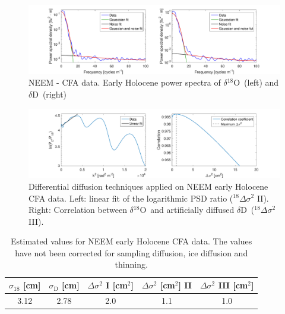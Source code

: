 \documentclass[11pt, draftcls, onecolumn]{IEEEtran} %
\numberwithin{equation}{section}
\numberwithin{table}{section}
\numberwithin{figure}{section}
\newcommand{\delOx}{$\delta{}^{18}\mathrm{O}$}
\newcommand{\delD}{$\delta\mathrm{D}$}
\begin{document}
\begin{appendices}
\begin{figure}[H]
	\vspace*{2mm}
	\begin{center}
		\includegraphics[width=1\textwidth]{Figure_25}
		\caption{NEEM - CFA data. Early Holocene power spectra of \delOx~(left) and \delD~(right)}  \label{fig:NEEM_cfa_fig_1}
	\end{center}
\end{figure}

\begin{figure}[H]
	\vspace*{2mm}
	\begin{center}
		\includegraphics[width=1\textwidth]{Figure_26}
		\caption{Differential diffusion techniques applied on NEEM early Holocene CFA data. 
			Left: linear fit of the logarithmic PSD ratio ($^{18}\Delta\sigma^2$ II). Right: 
			Correlation between \delOx~and artificially diffused \delD~($^{18}\Delta\sigma^2$ III).}  \label{fig:NEEM_cfa_fig_2}
	\end{center}
\end{figure}

\begin{table}[H]
	\center
	\caption{Estimated values for NEEM early Holocene CFA data.
	The values have not been corrected for sampling diffusion, ice diffusion and thinning.}
	\label{NEEM_cfa_tbl}
	\begin{tabular}{c c c c c} 
		\toprule
		$\sigma_{18}$ [cm] & $\sigma_\mathrm{D}$ [cm] & $\Delta\sigma^2$ I [cm$^2$] & $\Delta\sigma^2$ [cm$^2$] II & $\Delta\sigma^2$ III [cm$^2$] \\
		\midrule
	  3.12 &   2.78 &     2.0 &     1.1 &     1.0 \\

		\bottomrule		
	\end{tabular}
\end{table}
\clearpage

\end{appendices}
\end{document}
